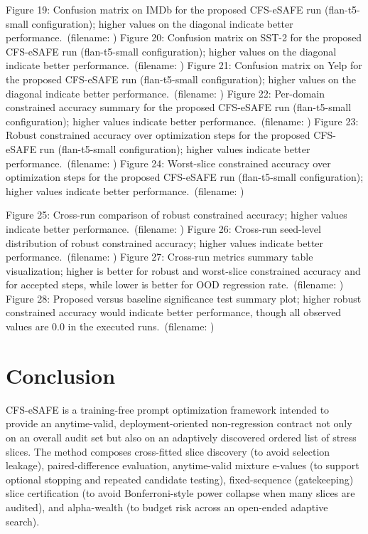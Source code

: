 \documentclass{article} %
\begin{document}
Figure 19: Confusion matrix on IMDb for the proposed CFS-eSAFE run (flan-t5-small configuration); higher values on the diagonal indicate better performance.\ (filename: )
Figure 20: Confusion matrix on SST-2 for the proposed CFS-eSAFE run (flan-t5-small configuration); higher values on the diagonal indicate better performance.\ (filename: )
Figure 21: Confusion matrix on Yelp for the proposed CFS-eSAFE run (flan-t5-small configuration); higher values on the diagonal indicate better performance.\ (filename: )
Figure 22: Per-domain constrained accuracy summary for the proposed CFS-eSAFE run (flan-t5-small configuration); higher values indicate better performance.\ (filename: )
Figure 23: Robust constrained accuracy over optimization steps for the proposed CFS-eSAFE run (flan-t5-small configuration); higher values indicate better performance.\ (filename: )
Figure 24: Worst-slice constrained accuracy over optimization steps for the proposed CFS-eSAFE run (flan-t5-small configuration); higher values indicate better performance.\ (filename: )

Figure 25: Cross-run comparison of robust constrained accuracy; higher values indicate better performance.\ (filename: )
Figure 26: Cross-run seed-level distribution of robust constrained accuracy; higher values indicate better performance.\ (filename: )
Figure 27: Cross-run metrics summary table visualization; higher is better for robust and worst-slice constrained accuracy and for accepted steps, while lower is better for OOD regression rate.\ (filename: )
Figure 28: Proposed versus baseline significance test summary plot; higher robust constrained accuracy would indicate better performance, though all observed values are 0.0 in the executed runs.\ (filename: )

\section{Conclusion}\label{sec:conclusion}
CFS-eSAFE is a training-free prompt optimization framework intended to provide an anytime-valid, deployment-oriented non-regression contract not only on an overall audit set but also on an adaptively discovered ordered list of stress slices. The method composes cross-fitted slice discovery (to avoid selection leakage), paired-difference evaluation, anytime-valid mixture e-values (to support optional stopping and repeated candidate testing), fixed-sequence (gatekeeping) slice certification (to avoid Bonferroni-style power collapse when many slices are audited), and alpha-wealth (to budget risk across an open-ended adaptive search).
\end{document}
